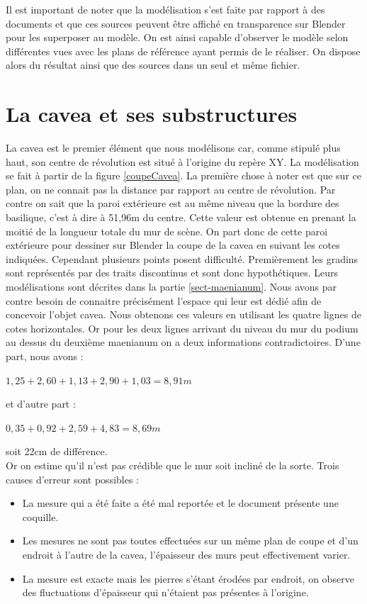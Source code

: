Il est important de noter que la modélisation s'est faite par rapport à des documents et que ces sources peuvent être affiché en transparence sur Blender pour les superposer au modèle. On est ainsi capable d'observer le modèle selon différentes vues avec les plans de référence ayant permis de le réaliser. On dispose alors du résultat ainsi que des sources dans un seul et même fichier.

\section{La cavea et ses substructures}  
	\label{La cavea et ses substructures}


La \gls{cavea} est le premier élément que nous modélisons car, comme stipulé plus haut, son centre de révolution est situé à l'origine du repère XY. La modélisation se fait à partir de la figure \ref{coupeCavea}. La première chose à noter est que sur ce plan, on ne connait pas la distance par rapport au centre de révolution. Par contre on sait que la paroi extérieure est au même niveau que la bordure des \gls{basilique}, c'est à dire à 51,96m du centre. Cette valeur est obtenue en prenant la moitié de la longueur totale du mur de scène. On part donc de cette paroi extérieure pour dessiner sur Blender la coupe de la \gls{cavea} en suivant les cotes indiquées. Cependant plusieurs points posent difficulté. Premièrement les gradins sont représentés par des traits discontinus et sont donc hypothétiques. Leurs modélisations sont décrites dans la partie \ref{sect-maenianum}. Nous avons par contre besoin de connaitre précisément l'espace qui leur est dédié afin de concevoir l'objet cavea. Nous obtenons ces valeurs en utilisant les quatre lignes de cotes horizontales. Or pour les deux lignes arrivant du niveau du mur du podium au dessus du deuxième \gls{maenianum} on a deux informations contradictoires. D'une part, nous avons :
\begin{center}
$1,25+2,60+1,13+2,90+1,03=8,91m$
\end{center}
et d'autre part :
\begin{center}
$0,35+0,92+2,59+4,83=8,69m$
\end{center}
soit 22cm de différence. \\

Or on estime qu'il n'est pas crédible que le mur soit incliné de la sorte. Trois causes d'erreur sont possibles :
\begin{itemize}
	\item La mesure qui a été faite a été mal reportée et le document présente une coquille.
	\item Les mesures ne sont pas toutes effectuées sur un même plan de coupe et d'un endroit à l'autre de la cavea, l'épaisseur des murs peut effectivement varier.
	\item La mesure est exacte mais les pierres s'étant érodées par endroit, on observe des fluctuations d'épaisseur qui n'étaient pas présentes à l'origine.
\end{itemize}

